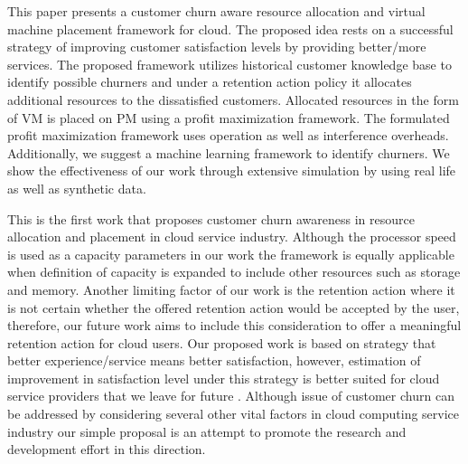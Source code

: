 This paper presents a customer churn aware resource allocation and virtual machine placement framework for cloud. The proposed idea rests on a successful strategy of improving customer satisfaction levels by providing better/more services. 
The proposed framework utilizes historical customer knowledge base to identify possible churners and under a retention action policy it allocates additional resources to the dissatisfied customers. Allocated resources in the form of VM is placed on PM using a profit maximization framework. The formulated profit maximization framework uses operation as well as interference overheads. Additionally, we suggest a machine learning framework to identify churners. We show the effectiveness of our work through extensive simulation by using real life as well as synthetic data. 

This is the first work that proposes customer churn awareness in resource allocation and placement in cloud service industry. Although the processor speed is used as a capacity parameters in our work the framework is equally applicable when definition of capacity is expanded to include other resources such as storage and memory. Another limiting factor of our work is the retention action where it is not certain whether the offered retention action would be accepted by the user, therefore, our future work aims to include this consideration to offer a meaningful retention action for cloud users. Our proposed work is based on strategy that better experience/service means better satisfaction, however, estimation of improvement in satisfaction level under this strategy is better suited for cloud service providers that we leave for future . Although issue of customer churn can be addressed by considering several other vital factors in cloud computing service industry our simple proposal is an attempt to promote the research and development effort in this direction.  


